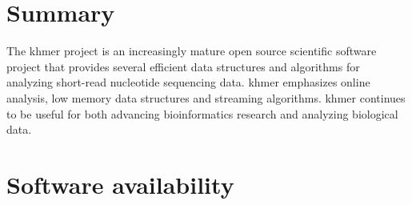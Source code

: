 \documentclass[10pt,a4paper]{article}
\begin{document}


\section*{Summary} %


The khmer project is an increasingly mature open source scientific software project that provides several efficient data structures and algorithms for analyzing short-read nucleotide sequencing data.  khmer emphasizes
online analysis, low memory data structures and streaming algorithms.  khmer continues to be useful for both advancing bioinformatics research and analyzing biological data.

\section*{Software availability}
\end{document}
